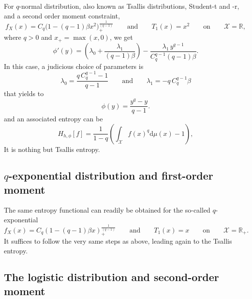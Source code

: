 \documentclass[english,onecolumn]{elsarticle}
\def\dmu{\mathrm{d}\mu}
\def\Rset{\mathbb{R}}
\def\X{\mathcal{X}}
\begin{document}
For $q$-normal distribution, also  known as Tsallis distributions, Student-t and
-r, and a second order moment constraint,
%
\[
f_X(x) = C_q \Big( 1 - (q-1) \beta x^2 \Big)_{\!+}^{\frac{1}{(q-1)}} \qquad
\mbox{and} \qquad T_1(x) = x^2 \qquad \mbox{on} \qquad \X = \Rset,
\]
%
where $q > 0$ and $x_+ = \max(x,0)$, we get
%
\[
\phi'(y) = \left( \lambda_0 + \frac{\lambda_1}{(q-1) \beta} \right) -
\frac{\lambda_1 \, y^{q-1}}{C_q^{q-1} (q-1) \beta}.
\]
%
In this case, a judicious choice of parameters is
%
\[
\lambda_0 = \frac{q \, C_q^{q-1}-1}{q-1} \qquad \mbox{and} \qquad \lambda_1 =
- q \, C_q^{q-1} \beta
\]
%
that yields to
\[
\phi(y) = \frac{y^q-y}{q-1}.
\]
%
and an associated entropy can be 
\[
H_{h,\phi}[f]=\frac{1}{1-q}\left(\int_{\X} f(x)^q \dmu(x) - 1 \right),
\]
%
It is nothing but Tsallis entropy.



\subsection{$q$-exponential distribution and first-order moment}
\label{subsec:qExponentialFirstOrder}

The  same  entropy  functional  can   readily  be  obtained  for  the  so-called
$q$-exponential
%
\[
f_X(x) = C_q \left(1-(q-1)\beta x\right)_+^{\frac{1}{(q-1)}} \qquad \mbox{and}
\qquad T_1(x) = x \qquad \mbox{on} \qquad \X = \Rset_+.
\]
%
It suffices to follow the very same steps as above, leading again to the Tsallis
entropy.




\subsection{The logistic distribution and second-order moment}
\label{subsec:LogisticSecondOrder}
\end{document}
